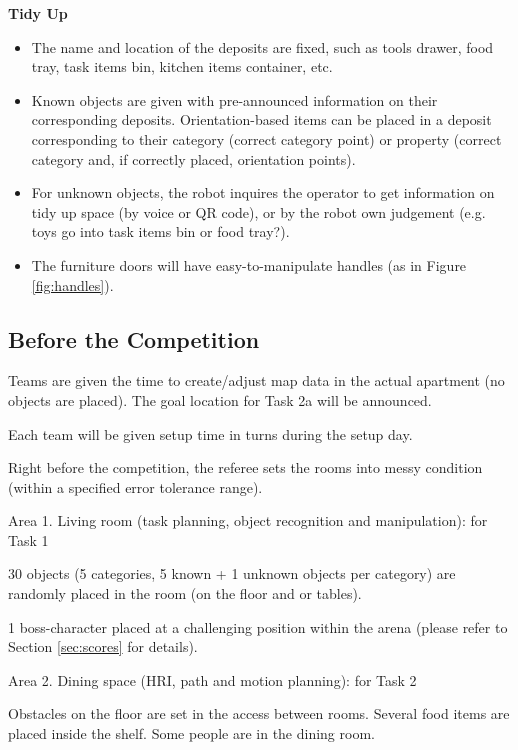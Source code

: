 \documentclass{article}
\newcommand{\SubItem}[1]{
    {\setlength\itemindent{15pt} \item[-] #1}
}
\begin{document}
\textbf{Tidy Up}
\begin{itemize}
    \item The name and location of the deposits are fixed, such as tools drawer, food tray, task items bin, kitchen items container, etc.
    \item Known objects are given with pre-announced information on their corresponding deposits. Orientation-based items can be placed in a deposit corresponding to their category (correct category point) or property (correct category and, if correctly placed, orientation points).
    \item For unknown objects, the robot inquires the operator to get information on tidy up space (by voice or QR code), or by the robot own judgement (e.g. toys go into task items bin or food tray?).
    \item The furniture doors will have easy-to-manipulate handles (as in Figure \ref{fig:handles}).
\end{itemize}

\subsection{Before the Competition}

\begin{itemize}
    \item Teams are given the time to create/adjust map data in the actual apartment (no objects are placed). The goal location for Task 2a will be announced.
    \item Each team will be given setup time in turns during the setup day.
    \item Right before the competition, the referee sets the rooms into messy condition (within a specified error tolerance range).
    \item Area 1. Living room (task planning, object recognition and manipulation): for Task 1
        \SubItem{30 objects (5 categories, 5 known + 1 unknown objects per category) are randomly placed in the room (on the floor and or tables).}
        \SubItem{1 boss-character placed at a challenging position within the arena (please refer to Section \ref{sec:scores} for details).}
    \item Area 2. Dining space (HRI, path and motion planning): for Task 2
        \SubItem{Obstacles on the floor are set in the access between rooms. Several food items are placed inside the shelf. Some people are in the dining room.}
\end{itemize}
\end{document}
